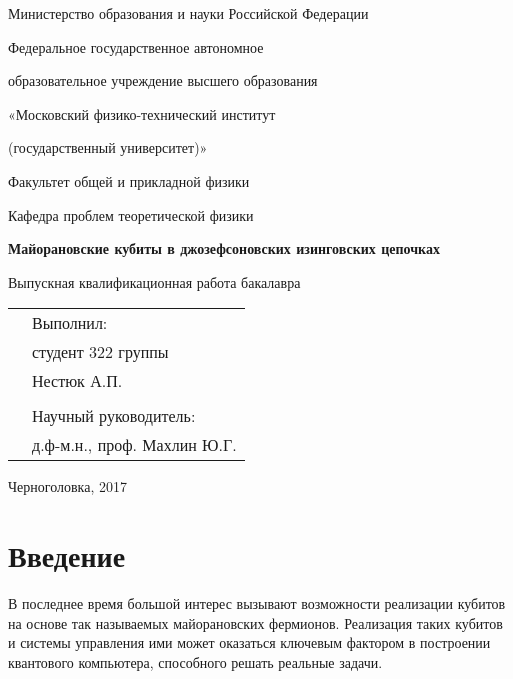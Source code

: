 \documentclass[a4paper,12pt]{article}
\author{}
\title{}
\date{\today}
\theoremstyle{plain} %
\theoremstyle{definition} %
\theoremstyle{remark} %
\begin{document}
    
\begin{titlepage}
    \begin{center}
        Министерство образования и науки Российской Федерации
        \linebreak
        
        Федеральное государственное автономное
        
        образовательное учреждение высшего образования 
        
        «Московский физико-технический институт 
        
        (государственный университет)»
        \linebreak
        
        Факультет общей и прикладной физики
        
        Кафедра проблем теоретической физики
        \vspace{100pt}
        
        \textbf{\LARGE Майорановские кубиты в джозефсоновских изинговских цепочках}
        \linebreak
        
        Выпускная квалификационная работа бакалавра
     \end{center}
     \vspace{90pt}
     
     \begin{flushright}
         \begin{tabular}{cl}
         &Выполнил:\\
         &студент 322 группы\\         
         &Нестюк А.П.\\
         &\\
         &Научный руководитель:\\
         &д.ф-м.н., проф. Махлин Ю.Г.
        \end{tabular}
    \end{flushright}
    \vspace{60pt}
    
    \begin{center}
        Черноголовка, 2017
    \end{center}
 \end{titlepage}   

\tableofcontents
\pagebreak

\section{Введение}
В последнее время большой интерес вызывают возможности реализации кубитов на основе так называемых майорановских фермионов. Реализация таких кубитов и системы управления ими может оказаться ключевым фактором в построении квантового компьютера, способного решать реальные задачи.
\end{document}
